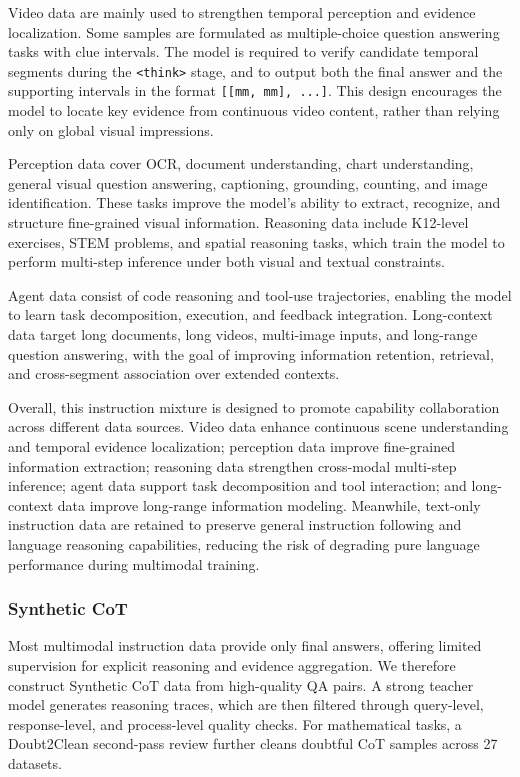 \documentclass{article} %
\begin{document}
Video data are mainly used to strengthen temporal perception and evidence localization. Some samples are formulated as multiple-choice question answering tasks with clue intervals. The model is required to verify candidate temporal segments during the \texttt{\textless think\textgreater} stage, and to output both the final answer and the supporting intervals in the format \texttt{[[mm, mm], ...]}. This design encourages the model to locate key evidence from continuous video content, rather than relying only on global visual impressions.

Perception data cover OCR, document understanding, chart understanding, general visual question answering, captioning, grounding, counting, and image identification. These tasks improve the model's ability to extract, recognize, and structure fine-grained visual information. Reasoning data include K12-level exercises, STEM problems, and spatial reasoning tasks, which train the model to perform multi-step inference under both visual and textual constraints. 

Agent data consist of code reasoning and tool-use trajectories, enabling the model to learn task decomposition, execution, and feedback integration. Long-context data target long documents, long videos, multi-image inputs, and long-range question answering, with the goal of improving information retention, retrieval, and cross-segment association over extended contexts.

Overall, this instruction mixture is designed to promote capability collaboration across different data sources. Video data enhance continuous scene understanding and temporal evidence localization; perception data improve fine-grained information extraction; reasoning data strengthen cross-modal multi-step inference; agent data support task decomposition and tool interaction; and long-context data improve long-range information modeling. Meanwhile, text-only instruction data are retained to preserve general instruction following and language reasoning capabilities, reducing the risk of degrading pure language performance during multimodal training.

\subsubsection{Synthetic CoT}

Most multimodal instruction data provide only final answers, offering limited supervision for explicit reasoning and evidence aggregation. We therefore construct Synthetic CoT data from high-quality QA pairs. A strong teacher model generates reasoning traces, which are then filtered through query-level, response-level, and process-level quality checks. For mathematical tasks, a Doubt2Clean second-pass review further cleans doubtful CoT samples across 27 datasets.
\end{document}
